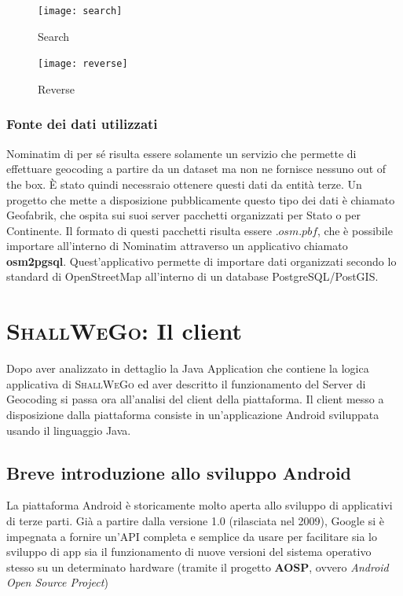         \begin{figure}[htp]
            \texttt{[image: search]}
            \caption{Search}
            \texttt{[image: reverse]}
            \caption{Reverse}
        \end{figure}


        \newpage
        \subsubsection{Fonte dei dati utilizzati}
            Nominatim di per sé risulta essere solamente un servizio che permette di effettuare geocoding a partire da un dataset ma non ne fornisce nessuno out of the box. È stato quindi necessraio ottenere questi dati da entità terze. Un progetto che mette a disposizione pubblicamente questo tipo dei dati è chiamato Geofabrik, che ospita sui suoi server pacchetti organizzati per Stato o per Continente. Il formato di questi pacchetti risulta essere $.osm.pbf$, che è possibile importare all'interno di Nominatim attraverso un applicativo chiamato \textbf{osm2pgsql}. Quest'applicativo permette di importare dati organizzati secondo lo standard di OpenStreetMap all'interno di un database PostgreSQL/PostGIS. \\
            
        \newpage
        \section{\textsc{ShallWeGo}: Il client}
            Dopo aver analizzato in dettaglio la Java Application che contiene la logica applicativa di \textsc{ShallWeGo} ed aver descritto il funzionamento del Server di Geocoding si passa ora all'analisi del client della piattaforma.
            Il client messo a disposizione dalla piattaforma consiste in un'applicazione Android sviluppata usando il linguaggio Java.

        \subsection{Breve introduzione allo sviluppo Android}
            La piattaforma Android è storicamente molto aperta allo sviluppo di applicativi di terze parti. Già a partire dalla versione 1.0 (rilasciata nel 2009), Google si è impegnata a fornire un'API completa e semplice da usare per facilitare sia lo sviluppo di app sia il funzionamento di nuove versioni del sistema operativo stesso su un determinato hardware (tramite il progetto \textbf{AOSP}, ovvero \textit{Android Open Source Project})

